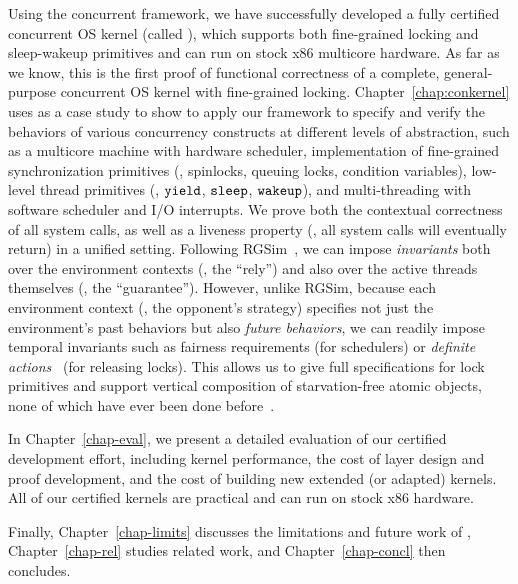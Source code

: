  Using the concurrent \CTOS{} framework, we have successfully developed a fully certified
  concurrent OS kernel (called {\bf \cCTOS}),
which  supports both fine-grained locking and sleep-wakeup primitives and
  can run on stock x86 multicore hardware.
  As far as we 
  know, this is the first proof of functional correctness of a complete,
  general-purpose concurrent OS kernel with fine-grained locking.
  Chapter~\ref{chap:conkernel} uses \cCTOS{}
  as a case study to show to apply our framework
  to specify and verify the behaviors of various concurrency
  constructs at different levels of abstraction, such as a multicore
  machine with hardware scheduler, implementation of fine-grained
  synchronization primitives (\eg, spinlocks, queuing locks,
  condition variables), low-level thread primitives (\eg, ${\texttt{yield}}$,
  ${\texttt{sleep}}$, ${\texttt{wakeup}}$), and multi-threading with software scheduler and I/O
  interrupts.
  We prove both the contextual
  correctness of all system calls, as well as a liveness property 
  (\ie,  all system calls will eventually return)
  in a unified setting.
  Following RGSim~\cite{RGSim}, we can impose
  {\em invariants} both over the environment contexts (\ie, the ``rely'')
  and also over the active threads themselves (\ie, the ``guarantee'').
  However, unlike RGSim,
  because each environment context (\ie, the opponent's strategy)
  specifies not just the environment's past behaviors
  but also {\em future behaviors}, we can readily impose temporal
  invariants such as fairness requirements (for schedulers) or
  {\em definite actions}~\cite{lili16} (for releasing locks). This allows
  us to give full specifications for lock primitives and support vertical
  composition of starvation-free atomic objects, none of which have ever
  been done before~\cite{lili16}.
    
    
In Chapter~\ref{chap-eval},   we present a detailed evaluation of our certified development
  effort, including kernel performance, the cost of
  layer design and proof development,
  and the cost of building new extended (or adapted)
  kernels. All of our certified kernels are practical and can run on stock
  x86 hardware. 
    
 Finally, Chapter~\ref{chap-limits} discusses
 the limitations and future work of \CTOS{},
Chapter~\ref{chap-rel}
 studies related work, and Chapter~\ref{chap-concl} then concludes.




